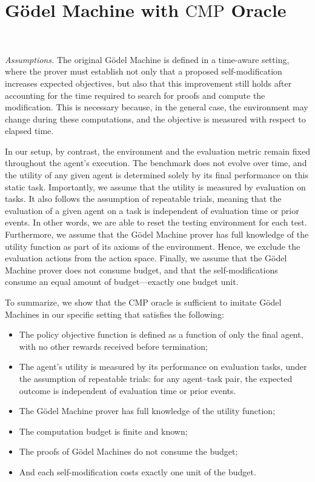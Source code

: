\documentclass{article}
\begin{document}




\appendix

\newpage


\section{G\"odel Machine with $\mathrm{CMP}$ Oracle}~\label{app:GM_CMP}


\textit{Assumptions. }The original G\"odel Machine is defined in a time-aware setting, where the prover must establish not only that a proposed self-modification increases expected objectives, but also that this improvement still holds after accounting for the time required to search for proofs and compute the modification. This is necessary because, in the general case, the environment may change during these computations, and the objective is measured with respect to elapsed time.

In our setup, by contrast, the environment and the evaluation metric remain fixed throughout the agent’s execution. The benchmark does not evolve over time, and the utility of any given agent is determined solely by its final performance on this static task. Importantly, we assume that the utility is measured by evaluation on tasks. It also follows the assumption of repeatable trials, meaning that the evaluation of a given agent on a task is independent of evaluation time or prior events. In other words, we are able to reset the testing environment for each test.
Furthermore, we assume that the G\"odel Machine prover has full knowledge of the utility function as part of its axioms of the environment. Hence, we exclude the evaluation actions from the action space. 
Finally, we assume that the G\"odel Machine prover does not consume budget, and that the self-modifications consume an equal amount of budget—exactly one budget unit.


To summarize, we show that the $\mathrm{CMP}$ oracle is sufficient to imitate G\"odel Machines in our specific setting that satisfies the following: \begin{itemize}
    \item The policy objective function is defined as a function of only the final agent, with no other rewards received before termination;
    \item The agent’s utility is measured by its performance on evaluation tasks, under the assumption of repeatable trials: for any agent–task pair, the expected outcome is independent of evaluation time or prior events.
    \item The G\"odel Machine prover has full knowledge of the utility function;
    \item The computation budget is finite and known;
    \item The proofs of G\"odel Machines do not consume the budget;
    \item And each self-modification costs exactly one unit of the budget.
\end{itemize}
\end{document}
